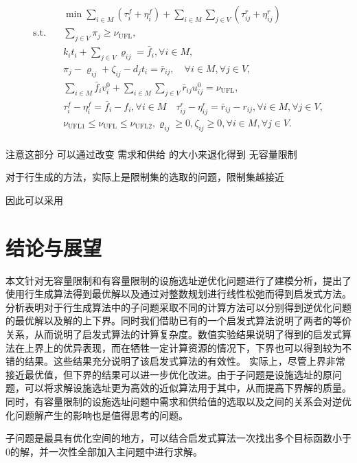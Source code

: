 \documentclass[UTF8]{article}
\begin{document}
\begin{equation}
\begin{aligned}
&\min \sum_{i \in M} \left(\tau_{i}^{f}+\eta_{i}^{f}\right)+\sum_{i \in M} \sum_{j \in V} \left(\tau_{i j}^r+\eta_{i j}^{r}\right) \\
\text{s.t.} \quad &\sum_{j \in V} \pi_{j} \geq \nu_{\mathrm{UFL}}, \\
&k_it_i+\sum_{j \in V} \varrho_{i j}=\bar{f}_{i}, \forall i \in M, \\
&\pi_{j}-\varrho_{i j}+\zeta_{i j}-d_jt_i=\bar{r}_{i j}, \quad \forall i \in M, \forall j \in V, \\
&\sum_{i \in M} \bar{f}_{i} v_{i}^{0}+\sum_{i \in M} \sum_{j \in V} \bar{r}_{i j} u_{i j}^{0}=\nu_{\mathrm{UFL}}, \\
& \tau_{i}^{f}-\eta_{i}^{f}=\bar{f}_{i}-f_{i}, \forall i \in M \quad \tau_{i j}^{r}-\eta_{i j}^{r}=\bar{r}_{i j}-r_{i j}, \forall i \in M, \forall j \in V, \\
&\nu_{\mathrm{UFL} 1} \leq \nu_{\mathrm{UFL}} \leq \nu_{\mathrm{UFL} 2}, \varrho_{i j} \geq 0, \zeta_{i j} \geq 0, \forall i \in M, \forall j \in V. \\
\end{aligned}
\end{equation}

注意这部分 可以通过改变 需求和供给 的大小来退化得到 无容量限制

对于行生成的方法，实际上是限制集的选取的问题，限制集越接近

因此可以采用

\section{结论与展望}
本文针对无容量限制和有容量限制的设施选址逆优化问题进行了建模分析，提出了使用行生成算法得到最优解以及通过对整数规划进行线性松弛而得到启发式方法。分析表明对于行生成算法中的子问题采取不同的计算方法可以分别得到逆优化问题的最优解以及解的上下界。同时我们借助已有的一个启发式算法说明了两者的等价关系，从而说明了启发式算法的计算复杂度。数值实验结果说明了得到的启发式算法在上界上的优异表现，而在牺牲一定计算资源的情况下，下界也可以得到较为不错的结果。这些结果充分说明了该启发式算法的有效性。
实际上，尽管上界非常接近最优值，但下界的结果可以进一步优化改进。由于子问题是设施选址的原问题，可以将求解设施选址更为高效的近似算法用于其中，从而提高下界解的质量。同时，有容量限制的设施选址问题中需求和供给值的选取以及之间的关系会对逆优化问题解产生的影响也是值得思考的问题。

子问题是最具有优化空间的地方，可以结合启发式算法一次找出多个目标函数小于0的解，并一次性全部加入主问题中进行求解。

\end{document}
